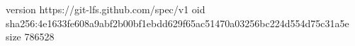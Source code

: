 version https://git-lfs.github.com/spec/v1
oid sha256:4e1633fe608a9abf2b00bf1ebdd629f65ac51470a03256bc224d554d75c31a5e
size 786528
